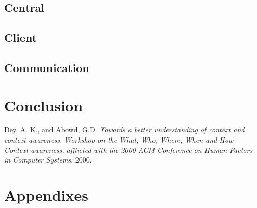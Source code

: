 \documentclass[]{report}
\begin{document}
\section{Central}

\section{Client}

\section{Communication}


\chapter{Conclusion}

\begin{thebibliography}{9}

  Dey, A. K., and Abowd, G.D.
  \emph{Towards a better understanding of context and context-awareness. Workshop on the What, Who, Where, When and How Context-awareness, afflicted with the 2000 ACM Conference on Human Factors in Computer Systems},
  2000.

\end{thebibliography}
\chapter{Appendixes}
\end{document}
